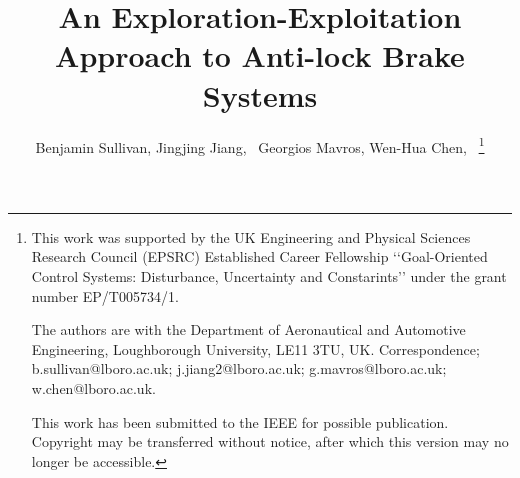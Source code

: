 \documentclass[onecolumn,journal,draftclsnofoot]{IEEEtran}
\begin{document}
\title{An Exploration-Exploitation Approach to Anti-lock Brake Systems}

\author{Benjamin Sullivan, Jingjing Jiang,~  Georgios Mavros, Wen-Hua Chen,~
\thanks{
This work was supported by the UK Engineering and Physical Sciences Research Council (EPSRC) Established Career Fellowship ‘‘Goal-Oriented Control Systems: Disturbance, Uncertainty and Constarints’’ under the grant number EP/T005734/1.

The authors are with the Department of Aeronautical and Automotive Engineering, Loughborough University, LE11 3TU, UK. Correspondence; b.sullivan@lboro.ac.uk; j.jiang2@lboro.ac.uk;  g.mavros@lboro.ac.uk; w.chen@lboro.ac.uk.

This work has been submitted to the IEEE for possible publication. Copyright may be transferred without notice, after which this version may no longer be accessible.
}}



\maketitle
\end{document}
